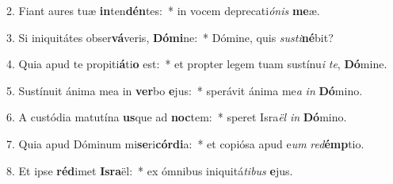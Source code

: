 2. Fiant aures tuæ \textbf{in}ten\textbf{dén}tes:~*  in vocem deprecati\textit{ó}\textit{nis} \textbf{me}æ.\

3. Si iniquitátes obser\textbf{vá}veris, \textbf{Dó}\textbf{mi}ne:~*  Dómine, quis \textit{sus}\textit{ti}\textbf{né}bit?\

4. Quia apud te propiti\textbf{á}ti\textbf{o} est:~*  et propter legem tuam sustínu\textit{i} \textit{te}, \textbf{Dó}mine.\

5. Sustínuit ánima mea in \textbf{ver}bo \textbf{e}jus:~*  sperávit ánima me\textit{a} \textit{in} \textbf{Dó}mino.\

6. A custódia matutína \textbf{us}que ad \textbf{noc}tem:~*  speret Isra\textit{ël} \textit{in} \textbf{Dó}mino.\

7. Quia apud Dóminum mi\textbf{se}ri\textbf{cór}\textbf{di}a:~*  et copiósa apud e\textit{um} \textit{red}\textbf{émp}tio.\

8. Et ipse \textbf{réd}imet \textbf{Is}\textbf{ra}ël:~*  ex ómnibus iniquitá\textit{ti}\textit{bus} \textbf{e}jus.\

